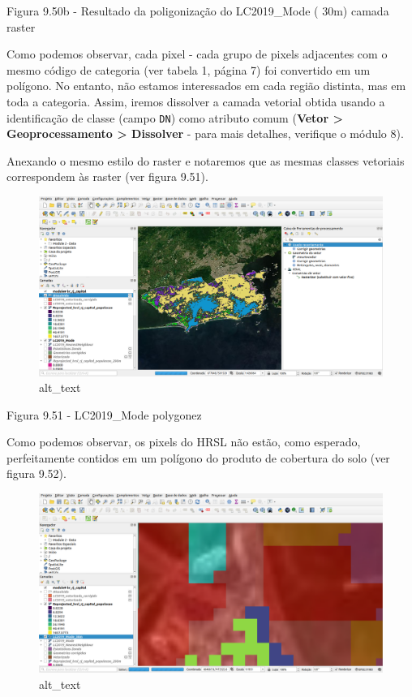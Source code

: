 \documentclass[
  portuguese,
]{krantz}
\begin{document}
Figura 9.50b - Resultado da poligonização do LC2019\_Mode ( 30m) camada raster

Como podemos observar, cada pixel - cada grupo de pixels adjacentes com o mesmo código de categoria (ver tabela 1, página 7) foi convertido em um polígono. No entanto, não estamos interessados \hspace{0pt}\hspace{0pt}em cada região distinta, mas em toda a categoria. Assim, iremos dissolver a camada vetorial obtida usando a identificação de classe (campo \texttt{DN}) como atributo comum (\textbf{Vetor \textgreater{} Geoprocessamento \textgreater{} Dissolver} - para mais detalhes, verifique o módulo 8).

Anexando o mesmo estilo do raster e notaremos que as mesmas classes vetoriais correspondem às raster (ver figura 9.51).

\begin{figure}
\centering
\includegraphics{media/modulo9/fig951.png}
\caption{alt\_text}
\end{figure}

Figura 9.51 - LC2019\_Mode polygonez

Como podemos observar, os pixels do HRSL não estão, como esperado, perfeitamente contidos em um polígono do produto de cobertura do solo (ver figura 9.52).

\begin{figure}
\centering
\includegraphics{media/modulo9/fig952.png}
\caption{alt\_text}
\end{figure}
\end{document}
